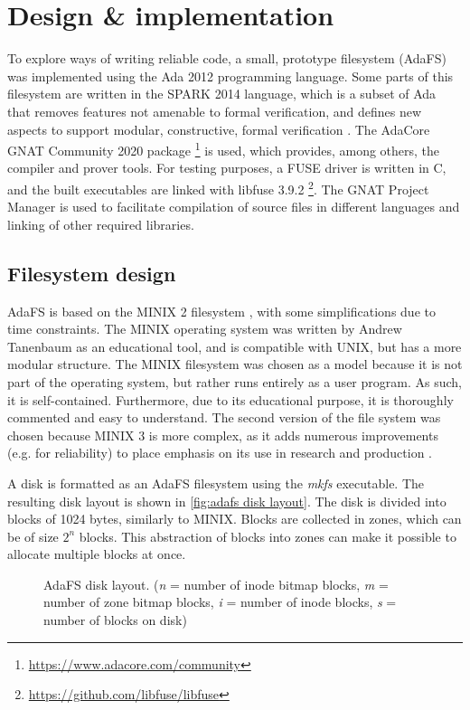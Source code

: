 \section{Design \& implementation}
To explore ways of writing reliable code, a small, prototype filesystem (AdaFS) was implemented using the Ada 2012 programming language.
Some parts of this filesystem are written in the SPARK 2014 language, which is a subset of Ada that removes features not amenable to formal verification, and defines new aspects to support modular, constructive, formal verification \cite{sparkRM}.
The AdaCore GNAT Community 2020 package \footnote{\url{https://www.adacore.com/community}} is used, which provides, among others, the compiler and prover tools.
For testing purposes, a FUSE driver is written in C, and the built executables are linked with libfuse 3.9.2 \footnote{\url{https://github.com/libfuse/libfuse}}.
The GNAT Project Manager is used to facilitate compilation of source files in different languages and linking of other required libraries.

\subsection{Filesystem design}
AdaFS is based on the MINIX 2 filesystem \cite{tanenbaum1997}, with some simplifications due to time constraints.
The MINIX operating system was written by Andrew Tanenbaum as an educational tool, and is compatible with UNIX, but has a more modular structure.
The MINIX filesystem was chosen as a model because it is not part of the operating system, but rather runs entirely as a user program.
As such, it is self-contained.
Furthermore, due to its educational purpose, it is thoroughly commented and easy to understand.
The second version of the file system was chosen because MINIX 3 is more complex, as it adds numerous improvements (e.g. for reliability) to place emphasis on its use in research and production \cite{minix3history}.

A disk is formatted as an AdaFS filesystem using the \textit{mkfs} executable.
The resulting disk layout is shown in \autoref{fig:adafs disk layout}.
The disk is divided into blocks of 1024 bytes, similarly to MINIX.
Blocks are collected in zones, which can be of size $2^n$ blocks.
This abstraction of blocks into zones can make it possible to allocate multiple blocks at once.

\begin{figure}[h]
  \centering
  \caption{AdaFS disk layout. (\textit{n} = number of inode bitmap blocks, \textit{m} = number of zone bitmap blocks, \textit{i} = number of inode blocks, \textit{s} = number of blocks on disk)}
  \label{fig:adafs disk layout}
\end{figure}

